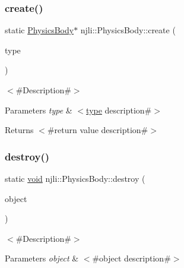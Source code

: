 \subsubsection{\texorpdfstring{create()}{create()}\hspace{0.1cm}{\footnotesize\ttfamily [2/2]}}
{\footnotesize\ttfamily static \mbox{\hyperlink{classnjli_1_1_physics_body}{Physics\+Body}}$\ast$ njli\+::\+Physics\+Body\+::create (\begin{DoxyParamCaption}\item[{\mbox{\hyperlink{_util_8h_a10e94b422ef0c20dcdec20d31a1f5049}{u32}}}]{type }\end{DoxyParamCaption})\hspace{0.3cm}{\ttfamily [static]}}

$<$\#\+Description\#$>$


\begin{DoxyParams}{Parameters}
{\em type} & $<$\mbox{\hyperlink{classnjli_1_1_physics_body_a98036bcbea6e3269603a83e532d2e5ab}{type}} description\#$>$\\
\hline
\end{DoxyParams}
\begin{DoxyReturn}{Returns}
$<$\#return value description\#$>$ 
\end{DoxyReturn}
\mbox{\label{classnjli_1_1_physics_body_a3b15b7f0943b31e6c2dd24661c82c4bf}} 
\subsubsection{\texorpdfstring{destroy()}{destroy()}}
{\footnotesize\ttfamily static \mbox{\hyperlink{_thread_8h_af1e856da2e658414cb2456cb6f7ebc66}{void}} njli\+::\+Physics\+Body\+::destroy (\begin{DoxyParamCaption}\item[{\mbox{\hyperlink{classnjli_1_1_physics_body}{Physics\+Body}} $\ast$}]{object }\end{DoxyParamCaption})\hspace{0.3cm}{\ttfamily [static]}}

$<$\#\+Description\#$>$


\begin{DoxyParams}{Parameters}
{\em object} & $<$\#object description\#$>$ \\
\hline
\end{DoxyParams}
\mbox{\label{classnjli_1_1_physics_body_a445e356d3e6757c2d629e307c3579e01}} 
